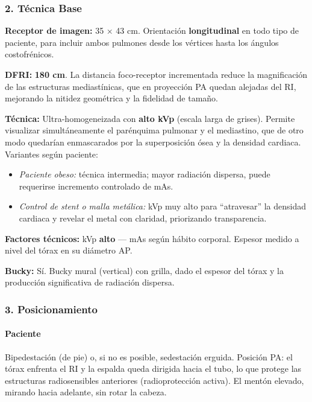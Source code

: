 		\subsubsection*{2. Técnica Base}
		
		\textbf{Receptor de imagen:} 35 × 43 cm. Orientación \textbf{longitudinal} en todo tipo de paciente,
		para incluir ambos pulmones desde los vértices hasta los ángulos costofrénicos.
		
		\textbf{DFRI:} \textbf{180 cm}. La distancia foco-receptor incrementada reduce la magnificación
		de las estructuras mediastínicas, que en proyección PA quedan alejadas del RI, mejorando la
		nitidez geométrica y la fidelidad de tamaño.
		
		\textbf{Técnica:} Ultra-homogeneizada con \textbf{alto kVp} (escala larga de grises). Permite
		visualizar simultáneamente el parénquima pulmonar y el mediastino, que de otro modo quedarían
		enmascarados por la superposición ósea y la densidad cardiaca. Variantes según paciente:
		\begin{itemize}
			\item \textit{Paciente obeso:} técnica intermedia; mayor radiación dispersa, puede requerirse
			incremento controlado de mAs.
			\item \textit{Control de stent o malla metálica:} kVp muy alto para ``atravesar'' la densidad
			cardiaca y revelar el metal con claridad, priorizando transparencia.
		\end{itemize}
		
		\textbf{Factores técnicos:} kVp \textbf{alto} --- mAs según hábito corporal.
		Espesor medido a nivel del tórax en su diámetro AP.
		
		\textbf{Bucky:} Sí. Bucky mural (vertical) con grilla, dado el espesor del tórax y la
		producción significativa de radiación dispersa.
		
		\subsubsection*{3. Posicionamiento}
		
		\paragraph{Paciente}
		Bipedestación (de pie) o, si no es posible, sedestación erguida. Posición PA: el tórax
		enfrenta el RI y la espalda queda dirigida hacia el tubo, lo que protege las estructuras
		radiosensibles anteriores (radioprotección activa). El mentón elevado, mirando hacia adelante,
		sin rotar la cabeza.
		
